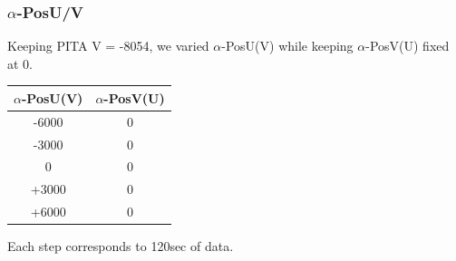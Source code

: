 \begin{frame}
	\frametitle{$\alpha$-PosU/V}
	Keeping PITA V = -8054, we varied $\alpha$-PosU(V) while keeping $\alpha$-PosV(U) fixed at 0. 
	
	\begin{center}
		\center

		\begin{tabular}{|c|c|}
			\hline
			$\alpha$-PosU(V)  &$\alpha$-PosV(U) \\\hline
			-6000&0\\
			-3000&0\\
			0&0\\
			+3000&0\\
			+6000&0\\\hline
		\end{tabular}
		
		\vspace{5mm}
		Each step corresponds to \approx 120sec of data.
	\end{center}
\end{frame}